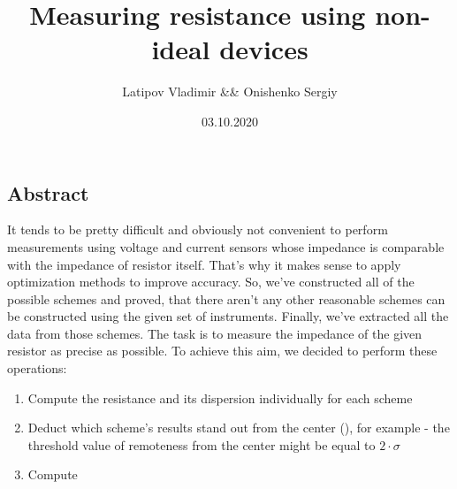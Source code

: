 \documentclass[11pt]{memoir}
\title{\textbf{\Huge{Measuring resistance using non-ideal devices}}}
\date{03.10.2020}
\author{Latipov Vladimir \&\& Onishenko Sergiy}
\begin{document}
    \renewcommand{\thesection}{\arabic{section}}

    \maketitle
    \newpage

    \tableofcontents

    \newpage


    \begin{vplace}
    \begin{center}

    \section{Abstract}\label{sec:abstract}
        It tends to be pretty difficult and obviously not convenient to perform measurements using voltage and current sensors whose impedance is comparable with the impedance of resistor itself.\newline
        That's why it makes sense to apply optimization methods to improve accuracy.\newline
        So, we've constructed all of the possible schemes and proved, that there aren't any other reasonable schemes can be constructed using the given set of instruments.\newline
        Finally, we've extracted all the data from those schemes.\newline
        The task is to measure the impedance of the given resistor as precise as possible.\newline
        To achieve this aim, we decided to perform these operations:\newline

        \begin{enumerate}
            \item Compute the resistance and its dispersion individually for each scheme
            \item Deduct which scheme's results stand out from the center (\mu), for example - the threshold value of remoteness from the center might be equal to $2 \cdot \sigma$
            \item Compute 
        \end{enumerate}

    \end{center}
    \end{vplace}

    \newpage

\end{document}
